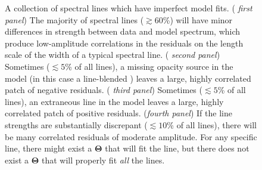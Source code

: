 \documentclass[iop,floatfix]{emulateapj}
\newcommand{\vT}{ {\bm \Theta}}
\begin{document}
\begin{figure}[!htb]
\begin{center}
  \caption{A collection of spectral lines which have imperfect model fits.
    ( {\it first panel}) The majority of spectral lines ($\gtrsim 60$\%) will
    have minor differences in strength between data and model spectrum, which
    produce low-amplitude correlations in the residuals on the length scale of
    the width of a typical spectral line.  ( {\it second panel}) Sometimes
    ($\lesssim 5$\% of all lines), a missing opacity source in the model (in
    this case a line-blended ) leaves a large, highly correlated
    patch of negative residuals.  ( {\it third panel}) Sometimes ($\lesssim
    5$\% of all lines), an extraneous line in the model leaves a large, highly
    correlated patch of positive residuals. ({\it fourth panel}) If the line
    strengths are substantially discrepant ($\lesssim 10$\% of all lines),
    there will be many correlated residuals of moderate amplitude. For any specific line, there might
    exist a $\vT$ that will fit the line, but there does not exist a $\vT$ that
    will properly fit \emph{all} the lines.}
\label{fig:badlines}
\end{center}
\end{figure}



\end{document}
